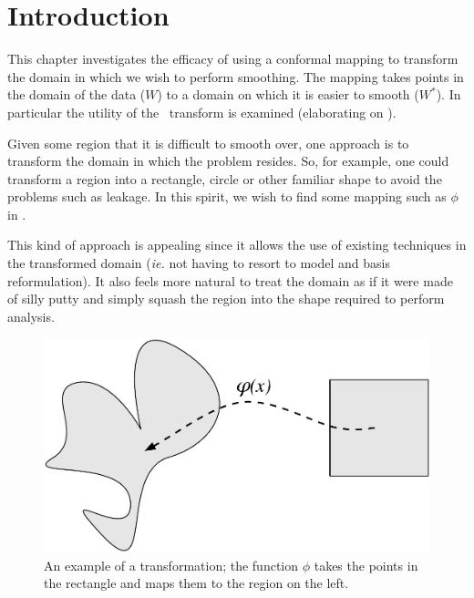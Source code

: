 
\label{chap-sc}

\section{Introduction}

This chapter investigates the efficacy of using a conformal mapping to transform the domain in which we wish to perform smoothing. The mapping takes points in the domain of the data ($W$) to a domain on which it is easier to smooth ($W^*$). In particular the utility of the \sch\ transform is examined (elaborating on \cite{eilerstalk}).

Given some region that it is difficult to smooth over, one approach is to transform the domain in which the problem resides. So, for example, one could transform a region into a rectangle, circle or other familiar shape to avoid the problems such as leakage. In this spirit, we wish to find some mapping such as $\phi$ in .

This kind of approach is appealing since it allows the use of existing techniques in the transformed domain (\emph{ie.} not having to resort to model and basis reformulation). It also feels more natural to treat the domain as if it were made of silly putty and simply squash the region into the shape required to perform analysis.

\begin{figure} [htbp]
\centering
\includegraphics[scale=0.3]{sc/figs/simpledia.pdf}
\caption{An example of a transformation; the function $\phi$ takes the points in the rectangle and maps them to the region on the left.}
\label{simpledia}
\end{figure}


